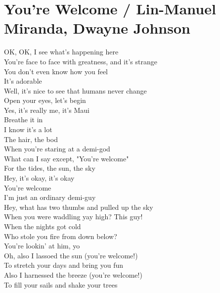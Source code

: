 \section{You're Welcome / Lin-Manuel Miranda, Dwayne Johnson}\label{sec:yourewelcome}
  
\Aminor
\Fmajor
\Cmajor
\Gmajor
  
OK, OK, I see what's happening here\\
You're face to face with greatness, and it's strange\\
You don't even know how you feel\\
It's adorable\\
Well, it's nice to see that humans never change\\
Open your eyes, let's begin\\
Yes, it's really me, it's Maui\\
Breathe it in\\
I know it's a lot\\
The hair, the bod\\
When you're staring at a demi-god\\
What can I say except, "You're welcome"\\
For the tides, the sun, the sky\\
Hey, it's okay, it's okay\\
You're welcome\\
I'm just an ordinary demi-guy\\
Hey, what has two thumbs and pulled up the sky\\
When you were waddling yay high? This guy!\\
When the nights got cold\\
Who stole you fire from down below?\\
You're lookin' at him, yo\\
Oh, also I lassoed the sun (you're welcome!)\\
To stretch your days and bring you fun\\
Also I harnessed the breeze (you're welcome!)\\
To fill your sails and shake your trees\\
